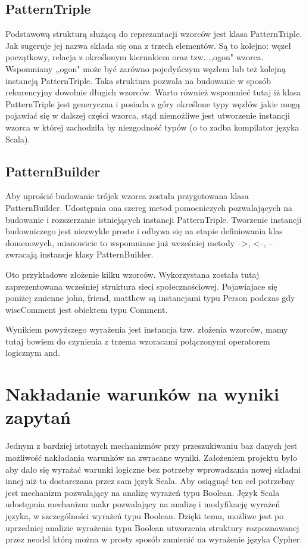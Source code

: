 \documentclass[brudnopis]{xmgr}
\begin{document}
\subsection{PatternTriple}
Podstawową strukturą służącą do reprezantacji wzorców jest klasa PatternTriple. Jak sugeruje jej nazwa składa się ona z trzech elementów. Są to kolejno: węzeł początkowy, relacja z określonym kierunkiem oraz tzw. ,,ogon" wzorca. Wspomniany ,,ogon" może być zarówno pojedyńczym węzłem lub też kolejną instancją PatternTriple. Taka struktura pozwala na budowanie w sposób rekurencyjny dowolnie długich wzorców. Warto również wspomnieć tutaj iż klasa PatternTriple jest generyczna i posiada z góry określone typy węzłów jakie mogą pojawiać się w dalszej części wzorca, stąd niemożliwe jest utworzenie instancji wzorca w której zachodziła by niezgodność typów (o to zadba kompilator języka Scala).

\subsection{PatternBuilder}
Aby uprościć budowanie trójek wzorca została przygotowana klasa PatternBuilder. Udostępnia ona szereg metod pomocniczych pozwalających na budowanie i rozszerzanie istniejących instancji PatternTriple. Tworzenie instancji budowniczego jest niezwykle proste i odbywa się na etapie definiowania klas domenowych, mianowicie to wspomniane już wcześniej metody -->, <--, -- zwracają instancje klasy PatternBuilder.

Oto przykładowe złożenie kilku wzorców. Wykorzystana została tutaj zaprezentowana wcześniej struktura sieci społecznościowej. Pojawiajace się poniżej zmienne john, friend, matthew są instancjami typu Person podczas gdy wiseComment jest obiektem typu Comment.



Wynikiem powyższego wyrażenia jest instancja tzw. złożenia wzorców, mamy tutaj bowiem do czynienia z trzema wzoracami połączonymi operatorem logicznym and. 

\section{Nakładanie warunków na wyniki zapytań}

Jednym z bardziej istotnych mechanizmów przy przeszukiwaniu baz danych jest możliwość nakładania warunków na zwracane wyniki. Założeniem projektu było aby dało się wyrażać warunki logiczne bez potrzeby wprowadzania nowej składni innej niż ta dostarczana przez sam język Scala. 
Aby osiągnąć ten cel potrzebny jest mechanizm pozwalający na analizę wyrażeń typu Boolean. Język Scala udostępnia mechanizm makr pozwalający na analizę i modyfikację wyrażeń języka, w szczególności wyrażeń typu Boolean. Dzięki temu, możliwe jest po uprzedniej analizie wyrażenia typu Boolean utworzenia struktury rozpoznawanej przez neodsl którą można w prosty sposób zamienić na wyrażenie języka Cypher.
\end{document}
